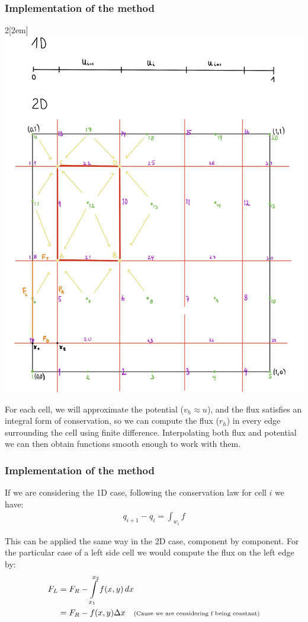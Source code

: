 \documentclass[t]{beamer}
\begin{document}
    \begin{frame}
        \frametitle{Implementation of the method}
        \begin{multicols}{2}[\columnsep2em] 
                \includegraphics[width=\linewidth]{square.jpg}
                \columnbreak
                
                For each cell, we will approximate the potential ($v_h \approx u$), and the flux satisfies an integral form of conservation, so we can compute the flux ($r_h$) in every edge surrounding the cell using finite difference. Interpolating both flux and potential we can then obtain functions smooth enough to work with them. 
            \end{multicols}
                
    \end{frame}

    \begin{frame}
        \frametitle{Implementation of the method}
        
        If we are considering the 1D case, following the conservation law for cell $i$ we have:
        \begin{align*}
            q_{i+1} - q_i =  \int_{w_i} f
        \end{align*}

        This can be applied the same way in the 2D case, component by component. For the particular case of a left side cell we would compute the flux on the left edge by:
        \begin{align*}
            F_L &= F_R - \int\limits_{x_1}^{x_2} f(x,y) \,dx\ \\
            &=  F_R - f(x,y)\Delta x \quad \text{\scriptsize{(Cause we are considering f being constant)}}
        \end{align*}
    \end{frame}
\end{document}

